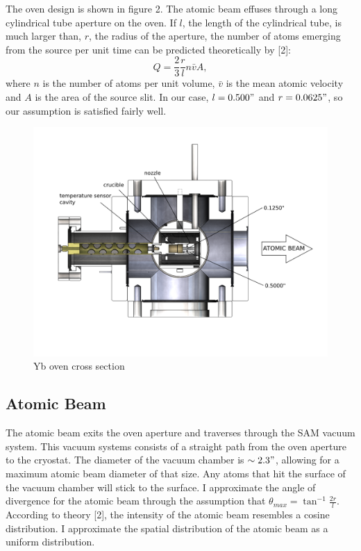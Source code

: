 \documentclass[12pt, a4paper]{article}
\begin{document}
The oven design is shown in figure 2. The atomic beam effuses through a long cylindrical tube aperture on the oven. If $l$, the length of the cylindrical tube, is much larger than, $r$, the radius of the aperture, the number of atoms emerging from the source per unit time can be predicted theoretically by [2]:
\begin{equation}
Q = \frac{2}{3}\frac{r}{l}n\bar{v}A,
\end{equation}
where $n$ is the number of atoms per unit volume, $\bar{v}$ is the mean atomic velocity and $A$ is the area of the source slit. In our case, $l = 0.500"$ and $r = 0.0625"$, so our assumption is satisfied fairly well.
\begin{figure}[h]
\centering
\captionsetup{justification=centering}
  \vspace*{-22mm}
  \includegraphics[scale=0.37]{ybOvenCrosssectionEdit.PNG}
  \vspace*{-20mm}
  \caption{Yb oven cross section}
\end{figure}

\subsection{Atomic Beam}
The atomic beam exits the oven aperture and traverses through the SAM vacuum system. This vacuum systems consists of a straight path from the oven aperture to the cryostat. The diameter of the vacuum chamber is $\sim 2.3"$, allowing for a maximum atomic beam diameter of that size. Any atoms that hit the surface of the vacuum chamber will stick to the surface. I approximate the angle of divergence for the atomic beam through the assumption that $\theta_{max} = \tan^{-1}\frac{2r}{l}$. According to theory [2], the intensity of the atomic beam resembles a cosine distribution. I approximate the spatial distribution of the atomic beam as a uniform distribution.
\end{document}
